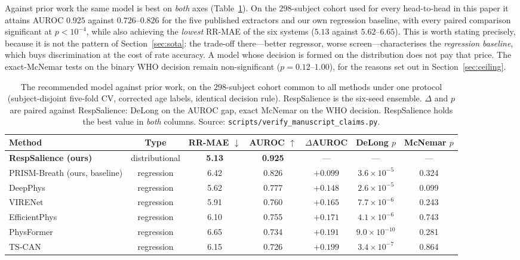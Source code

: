 \documentclass[journal]{IEEEtran}
\begin{document}
Against prior work the same model is best on \emph{both} axes (Table~\ref{tab:main}). On the
$298$-subject cohort used for every head-to-head in this paper it attains AUROC $0.925$ against
$0.726$--$0.826$ for the five published extractors and our own regression baseline, with every paired
comparison significant at $p<10^{-4}$, while also achieving the \emph{lowest} RR-MAE of the six systems
($5.13$ against $5.62$--$6.65$). This is worth stating precisely, because it is not the pattern of
Section~\ref{sec:sota}: the trade-off there---better regressor, worse screen---characterises the
\emph{regression baseline}, which buys discrimination at the cost of rate accuracy. A model whose
decision is formed on the distribution does not pay that price. The exact-McNemar tests on the binary
WHO decision remain non-significant ($p=0.12$--$1.00$), for the reasons set out in
Section~\ref{sec:ceiling}.

\begin{table}[!t]
\caption{The recommended model against prior work, on the $298$-subject cohort common to all methods
under one protocol (subject-disjoint five-fold CV, corrected age labels, identical decision rule).
RespSalience is the six-seed ensemble. $\Delta$ and $p$ are paired against RespSalience: DeLong on
the AUROC gap, exact McNemar on the WHO decision. RespSalience holds the best value in \emph{both}
columns. Source: \texttt{scripts/verify\_manuscript\_claims.py}.}
\label{tab:main}\centering\small
\begin{tabular}{@{}lcccccc@{}}\toprule
Method & Type & RR-MAE $\downarrow$ & AUROC $\uparrow$ & $\Delta$AUROC & DeLong $p$ & McNemar $p$\\\midrule
\textbf{RespSalience (ours)} & distributional & \textbf{5.13} & \textbf{0.925} & --- & --- & ---\\\midrule
PRISM-Breath (ours, baseline) & regression & 6.42 & 0.826 & $+0.099$ & $3.6{\times}10^{-5}$ & 0.324\\
DeepPhys~\cite{mcduff_deepphys}      & regression & 5.62 & 0.777 & $+0.148$ & $2.6{\times}10^{-5}$ & 0.099\\
VIRENet~\cite{infant_air}     & regression & 5.91 & 0.760 & $+0.165$ & $7.7{\times}10^{-6}$ & 0.243\\
EfficientPhys~\cite{liu_efficientphys} & regression & 6.10 & 0.755 & $+0.171$ & $4.1{\times}10^{-6}$ & 0.743\\
PhysFormer~\cite{yu_physformer}    & regression & 6.65 & 0.734 & $+0.191$ & $9.0{\times}10^{-10}$ & 0.281\\
TS-CAN~\cite{liu_mttscan}           & regression & 6.15 & 0.726 & $+0.199$ & $3.4{\times}10^{-7}$ & 0.864\\
\bottomrule
\end{tabular}
\end{table}
\end{document}

